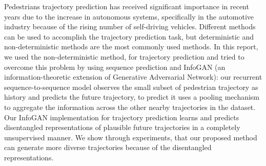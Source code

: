 Pedestrians trajectory prediction has received significant importance in recent years due to the increase in autonomous systems, specifically in the automotive industry because of the rising number of self-driving vehicles. Different methods can be used to accomplish the trajectory prediction task, but deterministic and non-deterministic methods are the most commonly used methods. In this report, we used the non-deterministic method, for trajectory prediction and tried to overcome this problem by using sequence prediction and InfoGAN (an information-theoretic extension of Generative Adversarial Network): our recurrent sequence-to-sequence model observes the small subset of pedestrian trajectory as history and predicts the future trajectory, to predict it uses a pooling mechanism to aggregate the information across the other nearby trajectories in the dataset. Our InfoGAN implementation for trajectory prediction learns and predicts disentangled representations of plausible future trajectories in a completely unsupervised manner. We show through experiments, that our proposed method can generate more diverse trajectories because of the disentangled representations.
